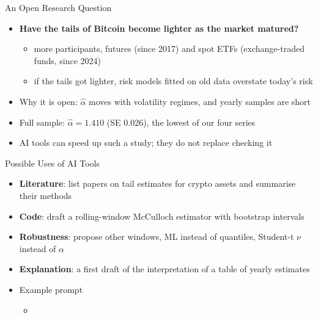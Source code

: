 \begin{frame}{An Open Research Question}
\itemsize{\small}
\begin{itemize}
    \item \textbf{Have the tails of Bitcoin become lighter as the market matured?}
    \begin{itemize}
        \item more participants, futures (since 2017) and spot ETFs (exchange-traded funds, since 2024)
        \item if the tails got lighter, risk models fitted on old data overstate today's risk
    \end{itemize}
    \item Why it is open: $\hat\alpha$ moves with volatility regimes, and yearly samples are short
    \item Full sample: $\hat\alpha = 1.410$ (SE $0.026$), the lowest of our four series
    \item AI tools can speed up such a study; they do not replace checking it 
\end{itemize}
\end{frame}

\begin{frame}{Possible Uses of AI Tools}
\itemsize{\small}
\begin{itemize}
    \item \textbf{Literature}: list papers on tail estimates for crypto assets and summarise their methods
    \item \textbf{Code}: draft a rolling-window McCulloch estimator with bootstrap intervals
    \item \textbf{Robustness}: propose other windows, ML instead of quantiles, Student-t $\nu$ instead of $\alpha$
    \item \textbf{Explanation}: a first draft of the interpretation of a table of yearly estimates
    \item Example prompt
    \begin{itemize}
        \item {}
    \end{itemize}
\end{itemize}
\end{frame}

